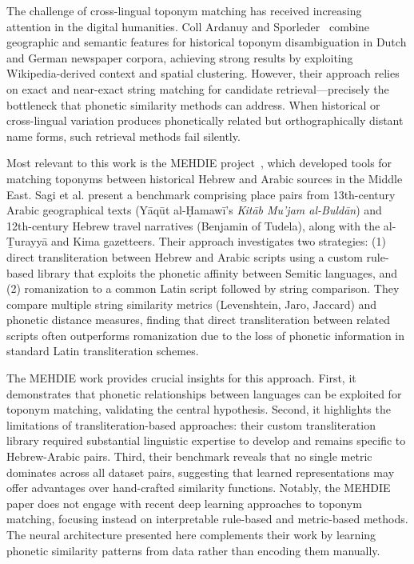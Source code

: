\documentclass[11pt]{article}
\begin{document}
    The challenge of cross-lingual toponym matching has received increasing attention in the digital humanities. Coll Ardanuy and Sporleder~\citep{ardanuy2017} combine geographic and semantic features for historical toponym disambiguation in Dutch and German newspaper corpora, achieving strong results by exploiting Wikipedia-derived context and spatial clustering. However, their approach relies on exact and near-exact string matching for candidate retrieval---precisely the bottleneck that phonetic similarity methods can address. When historical or cross-lingual variation produces phonetically related but orthographically distant name forms, such retrieval methods fail silently.

    Most relevant to this work is the MEHDIE project~\citep{mehdie2025}, which developed tools for matching toponyms between historical Hebrew and Arabic sources in the Middle East. Sagi et al. present a benchmark comprising place pairs from 13th-century Arabic geographical texts (Yāqūt al-Ḥamawī's \emph{Kitāb Mu'jam al-Buldān}) and 12th-century Hebrew travel narratives (Benjamin of Tudela), along with the al-Ṯurayyā and Kima gazetteers. Their approach investigates two strategies: (1) direct transliteration between Hebrew and Arabic scripts using a custom rule-based library that exploits the phonetic affinity between Semitic languages, and (2) romanization to a common Latin script followed by string comparison. They compare multiple string similarity metrics (Levenshtein, Jaro, Jaccard) and phonetic distance measures, finding that direct transliteration between related scripts often outperforms romanization due to the loss of phonetic information in standard Latin transliteration schemes.

    The MEHDIE work provides crucial insights for this approach. First, it demonstrates that phonetic relationships between languages can be exploited for toponym matching, validating the central hypothesis. Second, it highlights the limitations of transliteration-based approaches: their custom transliteration library required substantial linguistic expertise to develop and remains specific to Hebrew-Arabic pairs. Third, their benchmark reveals that no single metric dominates across all dataset pairs, suggesting that learned representations may offer advantages over hand-crafted similarity functions. Notably, the MEHDIE paper does not engage with recent deep learning approaches to toponym matching, focusing instead on interpretable rule-based and metric-based methods. The neural architecture presented here complements their work by learning phonetic similarity patterns from data rather than encoding them manually.
\end{document}
